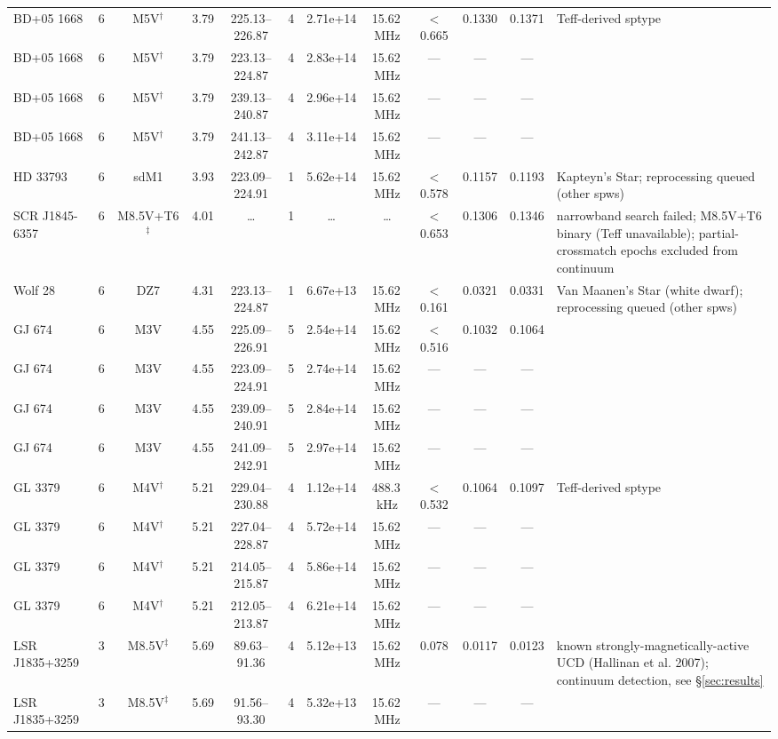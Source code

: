 \documentclass{openjournal}
\begin{document}
\begin{table}
\begin{tabularx}{\textwidth}{@{}l c c c c c c c c c c X@{}}
 BD+05  1668 & 6 & M5V$^\dagger$ & 3.79 & 225.13--226.87 & 4 & 2.71e+14 & 15.62\,MHz & $<$0.665 & 0.1330 & 0.1371 & Teff-derived sptype \\
 BD+05  1668 & 6 & M5V$^\dagger$ & 3.79 & 223.13--224.87 & 4 & 2.83e+14 & 15.62\,MHz & --- & --- & --- &  \\
 BD+05  1668 & 6 & M5V$^\dagger$ & 3.79 & 239.13--240.87 & 4 & 2.96e+14 & 15.62\,MHz & --- & --- & --- &  \\
 BD+05  1668 & 6 & M5V$^\dagger$ & 3.79 & 241.13--242.87 & 4 & 3.11e+14 & 15.62\,MHz & --- & --- & --- &  \\
 HD 33793 & 6 & sdM1 & 3.93 & 223.09--224.91 & 1 & 5.62e+14 & 15.62\,MHz & $<$0.578 & 0.1157 & 0.1193 & Kapteyn's Star; reprocessing queued (other spws) \\
 SCR J1845-6357 & 6 & M8.5V+T6$^\ddagger$ & 4.01 & \ldots & 1 & \ldots & \ldots & $<$0.653 & 0.1306 & 0.1346 & narrowband search failed; M8.5V+T6 binary (Teff unavailable); partial-crossmatch epochs excluded from continuum \\
 Wolf   28 & 6 & DZ7 & 4.31 & 223.13--224.87 & 1 & 6.67e+13 & 15.62\,MHz & $<$0.161 & 0.0321 & 0.0331 & Van Maanen's Star (white dwarf); reprocessing queued (other spws) \\
 GJ 674 & 6 & M3V & 4.55 & 225.09--226.91 & 5 & 2.54e+14 & 15.62\,MHz & $<$0.516 & 0.1032 & 0.1064 &  \\
 GJ 674 & 6 & M3V & 4.55 & 223.09--224.91 & 5 & 2.74e+14 & 15.62\,MHz & --- & --- & --- &  \\
 GJ 674 & 6 & M3V & 4.55 & 239.09--240.91 & 5 & 2.84e+14 & 15.62\,MHz & --- & --- & --- &  \\
 GJ 674 & 6 & M3V & 4.55 & 241.09--242.91 & 5 & 2.97e+14 & 15.62\,MHz & --- & --- & --- &  \\
 GL 3379 & 6 & M4V$^\dagger$ & 5.21 & 229.04--230.88 & 4 & 1.12e+14 & 488.3\,kHz & $<$0.532 & 0.1064 & 0.1097 & Teff-derived sptype \\
 GL 3379 & 6 & M4V$^\dagger$ & 5.21 & 227.04--228.87 & 4 & 5.72e+14 & 15.62\,MHz & --- & --- & --- &  \\
 GL 3379 & 6 & M4V$^\dagger$ & 5.21 & 214.05--215.87 & 4 & 5.86e+14 & 15.62\,MHz & --- & --- & --- &  \\
 GL 3379 & 6 & M4V$^\dagger$ & 5.21 & 212.05--213.87 & 4 & 6.21e+14 & 15.62\,MHz & --- & --- & --- &  \\
 LSR J1835+3259 & 3 & M8.5V$^\ddagger$ & 5.69 & 89.63--91.36 & 4 & 5.12e+13 & 15.62\,MHz & 0.078 & 0.0117 & 0.0123 & known strongly-magnetically-active UCD (Hallinan et al. 2007); continuum detection, see \S\ref{sec:results} \\
 LSR J1835+3259 & 3 & M8.5V$^\ddagger$ & 5.69 & 91.56--93.30 & 4 & 5.32e+13 & 15.62\,MHz & --- & --- & --- &  \\
\hline
\end{tabularx}
\end{table}
\end{document}
